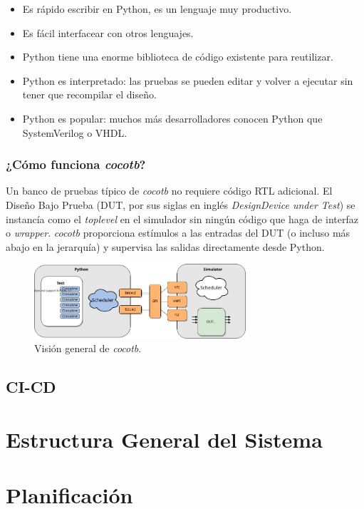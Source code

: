 \begin{itemize}
  \item Es rápido escribir en Python, es un lenguaje muy productivo.
  \item Es fácil interfacear con otros lenguajes.
  \item Python tiene una enorme biblioteca de código existente para reutilizar.
  \item Python es interpretado: las pruebas se pueden editar y volver a ejecutar
  sin tener que recompilar el diseño.
  \item Python es popular: muchos más desarrolladores conocen Python que
  SystemVerilog o VHDL.
\end{itemize}

\subsubsection{¿Cómo funciona \textit{cocotb}?}

Un banco de pruebas típico de \textit{cocotb} no requiere código RTL adicional.
El Diseño Bajo Prueba (DUT, por sus siglas en inglés \textit{Design\/Device
under Test}) se instancía como el \textit{toplevel} en el simulador sin ningún
código que haga de interfaz o \textit{wrapper}. \textit{cocotb} proporciona
estímulos a las entradas del DUT (o incluso más abajo en la jerarquía) y
supervisa las salidas directamente desde Python.

\begin{figure}[h]
  \centering
  \includegraphics[width=0.7\textwidth]{./Figures/cocotb_overview.png}
  \caption{Visión general de \textit{cocotb}.}
\end{figure}


\subsection{CI-CD}

\section{Estructura General del Sistema}

\section{{Planificación}}
